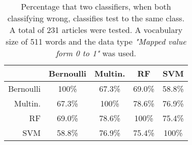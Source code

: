\begin{table}[h]\footnotesize
	\caption{Percentage that two classifiers, when both classifying wrong, classifies test to the same class. A total of 231 articles were tested. A vocabulary size of 511 words and the data type \emph{"Mapped value form 0 to 1"} was used.}
	\begin{tabular}{r|cccc}
	\ 		 	& Bernoulli & Multin. 	&RF 		&SVM \\ \hline
	Bernoulli 	&100\%   	&67.3\%   	&69.0\%   	&58.8\%\\
	Multin. 	&67.3\%  	&100\%   	&78.6\%   	&76.9\%\\
	RF 			&69.0\%   	&78.6\%  	&100\%   	&75.4\%\\
	SVM 		&58.8\%   	&76.9\%   	&75.4\%  	&100\%
	\end{tabular}
	\label{tab:similarity}
\end{table}
